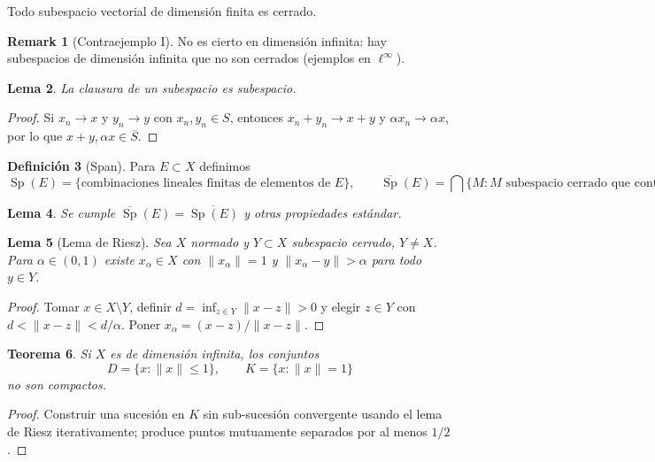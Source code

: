 \documentclass[11pt]{article}
\theoremstyle{definition}
\newtheorem{definition}{Definición}[section]
\newtheorem{remark}[definition]{Remark}
\theoremstyle{plain}
\newtheorem{lemma}[definition]{Lema}
\newtheorem{theorem}[definition]{Teorema}
\begin{document}
\begin{corollary}
Todo subespacio vectorial de dimensión finita es cerrado.
\end{corollary}

\begin{remark}[Contraejemplo I]
No es cierto en dimensión infinita: hay subespacios de dimensión infinita que no son cerrados (ejemplos en $\ell^\infty$).
\end{remark}

\begin{lemma}
La clausura de un subespacio es subespacio.
\end{lemma}
\begin{proof}
Si $x_n\to x$ y $y_n\to y$ con $x_n,y_n\in S$, entonces $x_n+y_n\to x+y$ y $\alpha x_n\to\alpha x$, por lo que $x+y,\alpha x\in\overline S$.
\end{proof}

\begin{definition}[Span]
Para $E\subset X$ definimos
\[\operatorname{Sp}(E)=\{\text{combinaciones lineales finitas de elementos de }E\},\qquad\overline{\operatorname{Sp}}(E)=\bigcap\{M: M\text{ subespacio cerrado que contiene }E\}.
\]
\end{definition}

\begin{lemma}
Se cumple $\overline{\operatorname{Sp}}(E)=\overline{\operatorname{Sp}(E)}$ y otras propiedades estándar.
\end{lemma}

\begin{lemma}[Lema de Riesz]
Sea $X$ normado y $Y\subset X$ subespacio cerrado, $Y\ne X$. Para $\alpha\in(0,1)$ existe $x_\alpha\in X$ con $\|x_\alpha\|=1$ y $\|x_\alpha-y\|>\alpha$ para todo $y\in Y$.
\end{lemma}
\begin{proof}
Tomar $x\in X\setminus Y$, definir $d=\inf_{z\in Y}\|x-z\|>0$ y elegir $z\in Y$ con $d<\|x-z\|<d/\alpha$. Poner $x_\alpha=(x-z)/\|x-z\|$.
\end{proof}

\begin{theorem}
Si $X$ es de dimensión infinita, los conjuntos
\[D=\{x:\|x\|\le1\},\qquad K=\{x:\|x\|=1\}\]
no son compactos.
\end{theorem}
\begin{proof}
Construir una sucesión en $K$ sin sub-sucesión convergente usando el lema de Riesz iterativamente; produce puntos mutuamente separados por al menos $1/2$.
\end{proof}
\end{document}
